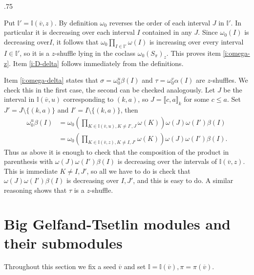 \documentclass[11pt,fleqn]{amsart}
\makeatletter
\renewcommand\proofname{Proof}
\renewenvironment{proof}[1][\textit{\proofname}]{\par
 \pushQED{\qed}%
 \normalfont \topsep.75\paraskip\relax
 \trivlist
 \item[\hskip\labelsep
 \itshape
 #1\@addpunct{.}]\ignorespaces
}{%
 \popQED\endtrivlist\@endpefalse
}
\newcounter{para}[section]
\newcommand\vv{\overline{v}}
\newcommand\II{\mathbb I}
\newcommand\interval[1]{\llbracket #1 \rrbracket}
\makeatother
\begin{document}
\begin{proof}
Put $\II' = \II(\vv,z)$.
By definition $\omega_0$ reverses the order of each interval $J$ in $\II'$. In
particular it is decreasing over each interval $I$ contained in any $J$. Since 
$\omega_0(I)$ is decreasing over$I$, it follows that $\omega_0 \prod_{I \in 
\II'} \omega(I)$ is increasing over every interval $I \in \II'$, so it is a 
$z$-shuffle lying in the coclass $\omega_0 (S_\pi)_z$. This proves item 
\ref{i:omega-z}. Item \ref{i:D-delta} follows immediately from the 
definitions. 

Item \ref{i:omega-delta} states that $\sigma = \omega_0^u \beta(I)$ and $\tau =
\omega_0^v \alpha(I)$ are $z$-shuffles. We check this in the first case, the
second can be checked analogously. Let $J$ be the interval in $\II(\vv,u)$
corresponding to $(k,a)$, so $J = \interval{c,a}_k$ for some $c \leq a$. Set
$J' = J \setminus \{(k,a)\}$ and $I' = I \setminus \{(k,a)\}$, then
\begin{align*}
\omega_0^u \beta(I)
	&= \omega_0 \left( \prod_{K \in \II(\vv, u), K \neq I',J} \omega(K) \right)
		\omega(J)\omega(I')\beta(I) \\
	&= \omega_0 \left( \prod_{K \in \II(\vv, z), K \neq I,J'} \omega(K) \right)
		\omega(J)\omega(I')\beta(I).
\end{align*}
Thus as above it is enough to check that the composition of the product in 
parenthesis with $\omega(J)\omega(I')\beta(I)$ is decreasing over the 
intervals of $\II(\vv,z)$. This is immediate $K \neq I, J'$, so all we have to 
do is check that $\omega(J)\omega(I')\beta(I)$ is decreasing over $I, J'$, and 
this is easy to do. A similar reasoning shows that $\tau$ is a $z$-shuffle.
\end{proof}

\section{Big Gelfand-Tsetlin modules and their submodules}
Throughout this section we fix a seed $\vv$ and set $\II = \II(\vv), \pi = 
\pi(\vv)$.
\end{document}
